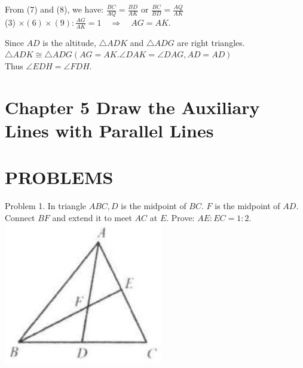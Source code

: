 \documentclass[10pt]{article}
\begin{document}
From (7) and (8), we have: \(\frac{B C}{A Q}=\frac{B D}{A K}\) or \(\frac{B C}{B D}=\frac{A Q}{A K}\)\\
(3) \(\times(6) \times(9): \frac{A G}{A K}=1 \quad \Rightarrow \quad A G=A K\).

Since \(A D\) is the altitude, \(\triangle A D K\) and \(\triangle A D G\) are right triangles.\\
\(\triangle A D K \cong \triangle A D G(A G=A K . \angle D A K=\angle D A G, A D=A D)\)\\
Thus \(\angle E D H=\angle F D H\).

\section*{Chapter 5 Draw the Auxiliary Lines with Parallel Lines}
\section*{PROBLEMS}
Problem 1. In triangle \(A B C, D\) is the midpoint of \(B C\). \(F\) is the midpoint of \(A D\). Connect \(B F\) and extend it to meet \(A C\) at \(E\). Prove: \(A E: E C=1: 2\).\\
\includegraphics[max width=\textwidth, center]{2025_04_17_97bc1f7e44d93c271a88g-126(3)}
\end{document}
